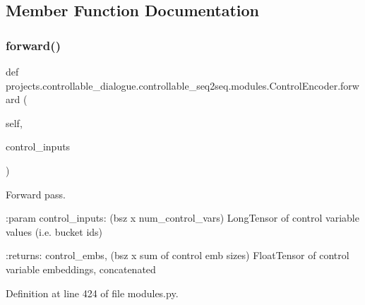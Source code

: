 \subsection{Member Function Documentation}
\mbox{\label{classprojects_1_1controllable__dialogue_1_1controllable__seq2seq_1_1modules_1_1ControlEncoder_ac2bef67897aca9040ff155659c786059}} 
\subsubsection{\texorpdfstring{forward()}{forward()}}
{\footnotesize\ttfamily def projects.\+controllable\+\_\+dialogue.\+controllable\+\_\+seq2seq.\+modules.\+Control\+Encoder.\+forward (\begin{DoxyParamCaption}\item[{}]{self,  }\item[{}]{control\+\_\+inputs }\end{DoxyParamCaption})}

\begin{DoxyVerb}Forward pass.

:param control_inputs: (bsz x num_control_vars) LongTensor of control
    variable values (i.e. bucket ids)

:returns: control_embs, (bsz x sum of control emb sizes) FloatTensor of
    control variable embeddings, concatenated
\end{DoxyVerb}
 

Definition at line 424 of file modules.\+py.


